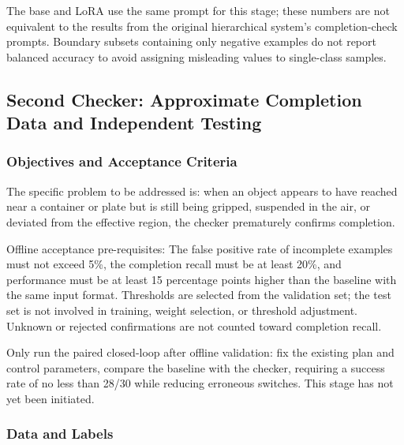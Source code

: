 The base and LoRA use the same prompt for this stage; these numbers are not equivalent to the results from the original hierarchical system's completion-check prompts. Boundary subsets containing only negative examples do not report balanced accuracy to avoid assigning misleading values to single-class samples.


\subsection{Second Checker: Approximate Completion Data and Independent Testing}\label{s11-detail-7}

\subsubsection{Objectives and Acceptance Criteria}\label{s11-detail-8}

The specific problem to be addressed is: when an object appears to have reached near a container or plate but is still being gripped, suspended in the air, or deviated from the effective region, the checker prematurely confirms completion.

Offline acceptance pre-requisites: The false positive rate of incomplete examples must not exceed 5\%, the completion recall must be at least 20\%, and performance must be at least 15 percentage points higher than the baseline with the same input format. Thresholds are selected from the validation set; the test set is not involved in training, weight selection, or threshold adjustment. Unknown or rejected confirmations are not counted toward completion recall.

Only run the paired closed-loop after offline validation: fix the existing plan and control parameters, compare the baseline with the checker, requiring a success rate of no less than 28/30 while reducing erroneous switches. This stage has not yet been initiated.

\subsubsection{Data and Labels}\label{s11-detail-9}

